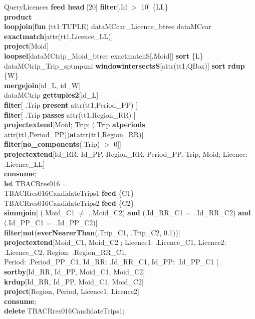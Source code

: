 \documentclass[a4paper]{article}
\newcommand{\op}[1]{\textbf{#1}}
\begin{document}
\begin{scriptsize}
\begin{tabbing}
\>QueryLicences \op{feed head} [20] \op{filter}[.Id $>$ 10] \{LL\}\\
\>\op{product}\\
\>\op{loopjoin}[\op{fun} (tt1:TUPLE) dataMCcar\_Licence\_btree dataMCcar \op{exactmatch}[attr(tt1,Licence\_LL)]\\
\>\>\op{project}[Moid]\\
\>\>\op{loopsel}[dataMCtrip\_Moid\_btree exactmatchS[.Moid]] \op{sort} \{L\}\\
\>\>dataMCtrip\_Trip\_sptmpuni \op{windowintersectsS}[attr(tt1,QBox)] \op{sort rdup} \{W\}\\
\>\>\op{mergejoin}[id\_L, id\_W]\\
\>\>dataMCtrip \op{gettuples2}[id\_L]\\
\>\>\op{filter}[ .Trip \op{present} attr(tt1,Period\_PP) ]\\
\>\>\op{filter}[ .Trip \op{passes}  attr(tt1,Region\_RR) ]\\
\>\>\op{projectextend}[Moid; Trip: (.Trip \op{atperiods} attr(tt1,Period\_PP))\op{at}attr(tt1,Region\_RR)]\\
\>\>\op{filter}[\op{no\_components}(.Trip) $>$ 0]]\\
\>\op{projectextend}[Id\_RR, Id\_PP, Region\_RR, Period\_PP, Trip, Moid; Licence: .Licence\_LL]\\
\op{consume};\\
\op{let} TBACRres016 =\\
\>TBACRres016CandidateTrips1 \op{feed} \{C1\}\\
\>TBACRres016CandidateTrips2 \op{feed} \{C2\}\\
\>\op{simmjoin}[ (.Moid\_C1 $\neq$ ..Moid\_C2) \op{and} (.Id\_RR\_C1 = ..Id\_RR\_C2) \op{and} (.Id\_PP\_C1 = ..Id\_PP\_C2)]\\
\>\op{filter}[\op{not}(\op{everNearerThan}(.Trip\_C1, .Trip\_C2, 0.1))]\\
\>\op{projectextend}[Moid\_C1, Moid\_C2 ; Licence1: .Licence\_C1, Licence2: .Licence\_C2, Region: .Region\_RR\_C1,\\
\>\>\>Period: .Period\_PP\_C1, Id\_RR: .Id\_RR\_C1, Id\_PP: .Id\_PP\_C1 ]\\
\>\op{sortby}[Id\_RR, Id\_PP, Moid\_C1, Moid\_C2]\\
\>\op{krdup}[Id\_RR, Id\_PP, Moid\_C1, Moid\_C2]\\
\>\op{project}[Region, Period, Licence1, Licence2]\\
\op{consume};\\
\op{delete} TBACRres016CandidateTrips1;\\

\end{tabbing}
\end{scriptsize}
\end{document}
